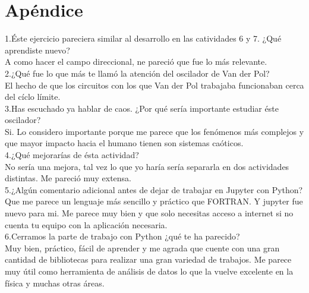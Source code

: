 \documentclass{article}
\begin{document}
\section{Apéndice}
1.Éste ejercicio pareciera similar al desarrollo en las catividades 6 y 7. ¿Qué aprendiste nuevo?\\
A como hacer el campo direccional, ne pareció que fue lo más relevante.\\
2.¿Qué fue lo que más te llamó la atención del oscilador de Van der Pol?\\
El hecho de que los circuitos con los que Van der Pol trabajaba funcionaban cerca del cíclo límite.\\
3.Has escuchado ya hablar de caos. ¿Por qué sería importante estudiar éste oscilador?\\
Si. Lo considero importante porque me parece que los fenómenos más complejos y que mayor impacto hacia el humano tienen son sistemas caóticos.\\
4.¿Qué mejorarías de ésta actividad?\\
No sería una mejora, tal vez lo que yo haría sería separarla en dos actividades distintas. Me pareció muy extensa.\\
5.¿Algún comentario adicional antes de dejar de trabajar en Jupyter con Python?\\
Que me parece un lenguaje más sencillo y práctico que FORTRAN. Y jupyter fue nuevo para mi. Me parece muy bien y que solo necesitas acceso a internet si no cuenta tu equipo con la aplicación necesaria.\\
6.Cerramos la parte de trabajo con Python ¿qué te ha parecido?\\
Muy bien, práctico, fácil de aprender y me agrada que cuente con una gran cantidad de bibliotecas para realizar una gran variedad de trabajos. Me parece muy útil como herramienta de análisis de datos lo que la vuelve excelente en la física y muchas otras áreas.\\
\end{document}
